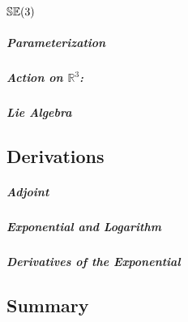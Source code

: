 \chapter{${\mathbb{SE}(3)}$}

\paragraph{Parameterization}

\paragraph{Action on $\mathbb{R}^3$:}

\paragraph{Lie Algebra}

\section{Derivations}

\paragraph{Adjoint}

\paragraph{Exponential and Logarithm}

\paragraph{Derivatives of the Exponential}

\section{Summary}

